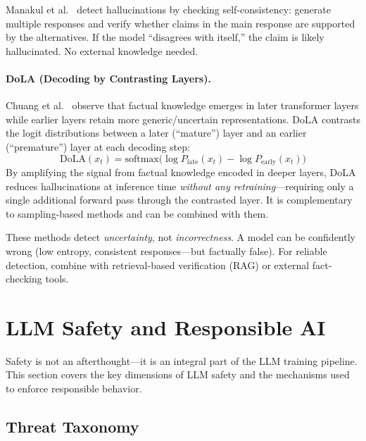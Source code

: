 Manakul et al.~\cite{manakul2023selfcheckgpt} detect hallucinations by checking self-consistency: generate multiple responses and verify whether claims in the main response are supported by the alternatives. If the model ``disagrees with itself,'' the claim is likely hallucinated. No external knowledge needed.

\paragraph{DoLA (Decoding by Contrasting Layers).}
\label{dola-decoding-by-contrasting-layers.}

Chuang et al.~\cite{chuang2024dola} observe that factual knowledge emerges in later transformer layers while earlier layers retain more generic/uncertain representations. DoLA contrasts the logit distributions between a later (``mature'') layer and an earlier (``premature'') layer at each decoding step: 
\[
\text{DoLA}(x_t) = \text{softmax}\!\bigl(\log P_{\text{late}}(x_t) - \log P_{\text{early}}(x_t)\bigr)
\]
 By amplifying the signal from factual knowledge encoded in deeper layers, DoLA reduces hallucinations at inference time \emph{without any retraining}---requiring only a single additional forward pass through the contrasted layer. It is complementary to sampling-based methods and can be combined with them.

\begin{warningbox}
These methods detect \emph{uncertainty}, not \emph{incorrectness}. A model can be confidently wrong (low entropy, consistent responses---but factually false). For reliable detection, combine with retrieval-based verification (RAG) or external fact-checking tools.
\end{warningbox}

\section{LLM Safety and Responsible AI}
\label{sec:safety}

Safety is not an afterthought---it is an integral part of the LLM training pipeline. This section covers the key dimensions of LLM safety and the mechanisms used to enforce responsible behavior.

\subsection{Threat Taxonomy}
\label{threat-taxonomy}

